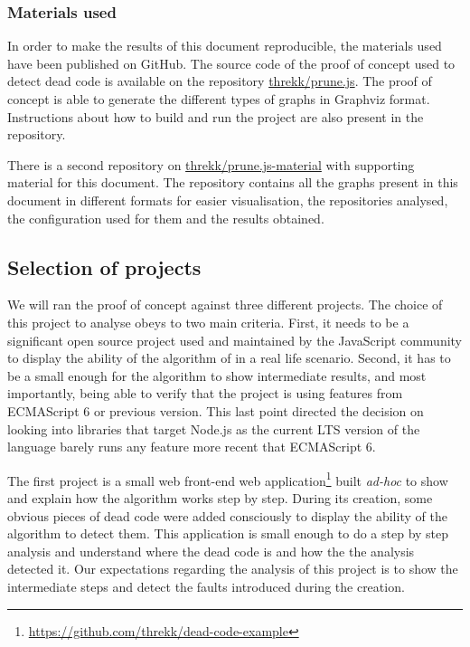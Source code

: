 \documentclass{uvamscse}
\begin{document}
\subsubsection{Materials used}
In order to make the results of this document reproducible, the materials used have been published on GitHub. The source code of the proof of concept used to detect dead code is available on the repository \href{https://github.com/threkk/prune.js}{threkk/prune.js}. The proof of concept is able to generate the different types of graphs in Graphviz format. Instructions about how to build and run the project are also present in the repository.  

There is a second repository on \href{https://github.com/threkk/prune.js-material}{threkk/prune.js-material} with supporting material for this document. The repository contains all the graphs present in this document in different formats for easier visualisation, the repositories analysed, the configuration used for them and the results obtained.

\subsection{Selection of projects}
We will ran the proof of concept against three different projects. The choice of this project to analyse obeys to two main criteria. First, it needs to be a significant open source project used and maintained by the JavaScript community to display the ability of the algorithm of in a real life scenario. Second, it has to be a small enough for the algorithm to show intermediate results, and most importantly, being able to verify that the project is using features from ECMAScript 6 or previous version. This last point directed the decision on looking into libraries that target Node.js as the current LTS version of the language barely runs any feature more recent that ECMAScript 6.

The first project is a small web front-end web application\footnote{\url{https://github.com/threkk/dead-code-example}} built \textit{ad-hoc} to show and explain how the algorithm works step by step. During its creation, some obvious pieces of dead code were added consciously to display the ability of the algorithm to detect them. This application is small enough to do a step by step analysis and understand where the dead code is and how the the analysis detected it. Our expectations regarding the analysis of this project is to show the intermediate steps and detect the faults introduced during the creation. 
\end{document}
